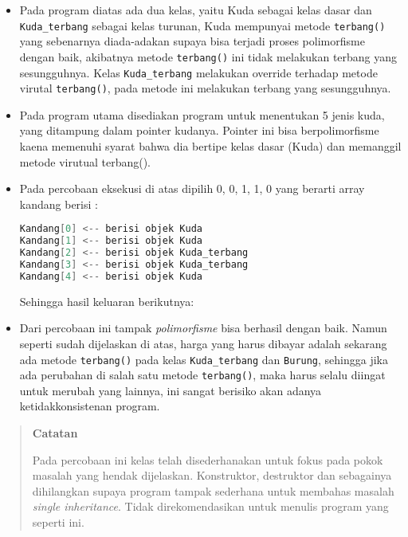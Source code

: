 \begin{itemize}
\item
  Pada program diatas ada dua kelas, yaitu Kuda sebagai kelas dasar dan
  \texttt{Kuda\_terbang} sebagai kelas turunan, Kuda mempunyai metode
  \texttt{terbang()} yang sebenarnya diada-adakan supaya bisa terjadi
  proses polimorfisme dengan baik, akibatnya metode \texttt{terbang()}
  ini tidak melakukan terbang yang sesungguhnya. Kelas
  \texttt{Kuda\_terbang} melakukan override terhadap metode virutal
  \texttt{terbang()}, pada metode ini melakukan terbang yang
  sesungguhnya.
\item
  Pada program utama disediakan program untuk menentukan 5 jenis kuda,
  yang ditampung dalam pointer kudanya. Pointer ini bisa berpolimorfisme
  kaena memenuhi syarat bahwa dia bertipe kelas dasar (Kuda) dan
  memanggil metode virutual terbang().
\item
  Pada percobaan eksekusi di atas dipilih 0, 0, 1, 1, 0 yang berarti
  array kandang berisi :

\begin{lstlisting}[language=c++, numbers=none]
Kandang[0] <-- berisi objek Kuda 
Kandang[1] <-- berisi objek Kuda 
Kandang[2] <-- berisi objek Kuda_terbang 
Kandang[3] <-- berisi objek Kuda_terbang 
Kandang[4] <-- berisi objek Kuda 
\end{lstlisting}

  Sehingga hasil keluaran berikutnya:


\item
  Dari percobaan ini tampak \emph{polimorfisme} bisa berhasil dengan
  baik. Namun seperti sudah dijelaskan di atas, harga yang harus dibayar
  adalah sekarang ada metode \texttt{terbang()} pada kelas
  \texttt{Kuda\_terbang} dan \texttt{Burung}, sehingga jika ada
  perubahan di salah satu metode \texttt{terbang()}, maka harus selalu
  diingat untuk merubah yang lainnya, ini sangat berisiko akan adanya
  ketidakkonsistenan program.
\end{itemize}
\begin{quotation}
 {\LARGE {}} 	\textbf{Catatan}
	
	Pada	percobaan ini kelas telah disederhanakan untuk fokus pada pokok masalah
	yang hendak dijelaskan. Konstruktor, destruktor dan sebagainya
	dihilangkan supaya program tampak sederhana untuk membahas masalah
	\emph{single inheritance}. Tidak direkomendasikan untuk menulis program
	yang seperti ini.
\end{quotation}



